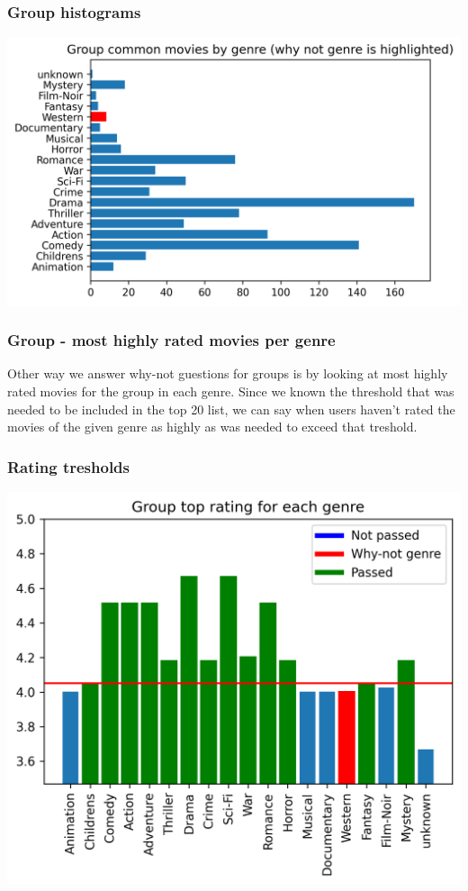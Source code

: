 \documentclass{beamer}
\begin{document}
\begin{frame}
  \frametitle{Group histograms}
  \includegraphics[width=\textwidth]{genre_moviesbygenre.png}
\end{frame}


\begin{frame}
  \frametitle{Group - most highly rated movies per genre}
  Other way we answer why-not guestions for groups is by looking at most highly rated movies for the group in each genre.
  Since we known the threshold that was needed to be included in the top 20 list, we can say when users haven't rated the movies
  of the given genre as highly as was needed to exceed that treshold.
  
\end{frame}

\begin{frame}
  \frametitle{Rating tresholds}
  \begin{center}
  \includegraphics[height=0.85\textheight]{genre_toprating.png}
  \end{center}
\end{frame}
\end{document}

